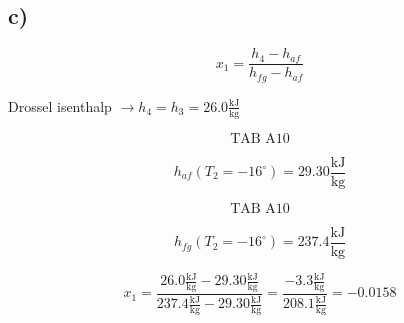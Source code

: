 

\subsection*{c)}

\[
x_1 = \frac{h_4 - h_{af}}{h_{fg} - h_{af}}
\]

Drossel isenthalp $\rightarrow h_4 = h_3 = 26.0 \frac{\text{kJ}}{\text{kg}}$

\[
\text{TAB A10}
\]

\[
h_{af}(T_2 = -16^\circ) = 29.30 \frac{\text{kJ}}{\text{kg}}
\]

\[
\text{TAB A10}
\]

\[
h_{fg}(T_2 = -16^\circ) = 237.4 \frac{\text{kJ}}{\text{kg}}
\]

\[
x_1 = \frac{26.0 \frac{\text{kJ}}{\text{kg}} - 29.30 \frac{\text{kJ}}{\text{kg}}}{237.4 \frac{\text{kJ}}{\text{kg}} - 29.30 \frac{\text{kJ}}{\text{kg}}} = \frac{-3.3 \frac{\text{kJ}}{\text{kg}}}{208.1 \frac{\text{kJ}}{\text{kg}}} = -0.0158
\]